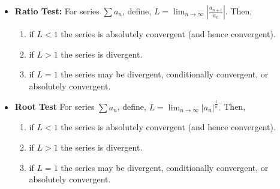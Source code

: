 \documentclass{article}
\newenvironment{bx}[1][]{
\begin{tcolorbox}[colback=white!97!black, title=#1, arc=0in, halign=flush left, left=1mm, right=1mm,]
}{
\end{tcolorbox}
}
\begin{document}
\begin{multicols}{2}
\begin{bx}[Test for Convergence and Divergence]
\begin{itemize}[leftmargin=1em]
\item \textbf{Ratio Test:}
For series $\sum a_{n}$, define, $ L={\displaystyle\lim _{n \to \infty}} \left|\frac{a_{n+1}}{a_{n}}\right|.$ Then,
\begin{enumerate}[leftmargin=1em]
    \item if $L<1$ the series is absolutely convergent (and hence convergent).
    \item if $L>1$ the series is divergent.
    \item  if $L=1$ the series may be divergent, conditionally convergent, or absolutely convergent.
\end{enumerate}

\item \textbf{Root Test}
For series $\sum a_{n}$, define,
$L={\displaystyle\lim _{n \to \infty}}\left|a_{n}\right|^{\frac{1}{n}}.$ Then,
\begin{enumerate}[leftmargin=1em]
    \item if $L<1$ the series is absolutely convergent (and hence convergent).
    \item if $L>1$ the series is divergent.
    \item if $L=1$ the series may be divergent, conditionally convergent, or absolutely convergent.
\end{enumerate}


\end{itemize}
\end{bx}

\end{multicols}
\end{document}
